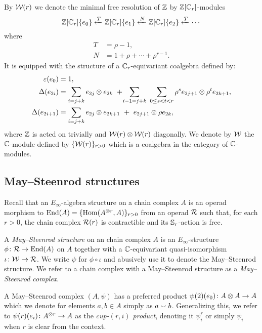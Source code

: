 By $\mathcal{W}(r)$ we denote the minimal free resolution of $\mathbb{Z}$ by $\mathbb{Z}[\mathbb{C}_r]$-modules
\begin{equation}\label{eq: minimal resolution}
	\mathbb{Z}[\mathbb{C}_r]\{e_0\} \xleftarrow{T} \mathbb{Z}[\mathbb{C}_r]\{e_1\} \xleftarrow{N} \mathbb{Z}[\mathbb{C}_r]\{e_2\} \xleftarrow{T} \cdots
\end{equation}
where
\begin{equation} \label{eq: T and R definition}
	\begin{split}
		T &= \rho - 1, \\
		N &= 1 + \rho + \cdots + \rho^{r-1}.
	\end{split}
\end{equation}
It is equipped with the structure of a $\mathbb{C}_r$-equivariant coalgebra defined by:
\begin{align*}
	\varepsilon(e_0) &= 1, \\
	\Delta(e_{2i}) &=
	\sum_{i=j+k} e_{2j} \otimes e_{2k} \ + \! \sum_{i-1=j+k} \ \sum_{0 \leq s < t < r} \rho^s e_{2j+1} \otimes \rho^t e_{2k+1}, \\
	\Delta(e_{2i+1}) &=
	\sum_{i=j+k} e_{2j} \otimes e_{2k+1} \ +\ e_{2j+1} \otimes \rho e_{2k},
\end{align*}
where $\mathbb{Z}$ is acted on trivially and $\mathcal{W}(r) \otimes \mathcal{W}(r)$ diagonally.
We denote by $\mathcal{W}$ the $\mathbb{C}$-module defined by $\{\mathcal{W}(r)\}_{r > 0}$ which is a coalgebra in the category of $\mathbb{C}$-modules.

\subsection{May--Steenrod structures}

Recall that an $E_\infty$-algebra structure on a chain complex $A$ is an operad morphism to $\mathrm{End}(A) = \{\mathrm{Hom}(A^{\otimes r}, A)\}_{r>0}$ from an operad $\mathcal{R}$ such that, for each $r > 0$, the chain complex $\mathcal{R}(r)$ is contractible and its $\mathbb{S}_r$-action is free.

A \textit{May--Steenrod structure} on an chain complex $A$ is an $E_\infty$-structure $\phi \colon \mathcal{R} \to \mathrm{End}(A)$ on $A$ together with a $\mathbb{C}$-equivariant quasi-isomorphism $\iota \colon \mathcal{W} \to \mathcal{R}$.
We write $\psi$ for $\phi \circ \iota$ and abusively use it to denote the May--Steenrod structure.
We refer to a chain complex with a May--Steenrod structure as a \textit{May--Steenrod complex}.

A May--Steenrod complex $(A,\psi)$ has a preferred product $\psi(2)(e_0) \colon A \otimes A \to A$ which we denote for elements $a, b \in A$ simply as $a \smallsmile b$.
Generalizing this, we refer to $\psi(r)(e_i) \colon A^{\otimes r} \to A$ as the \textit{cup-$(r,i)$ product}, denoting it $\psi_i^r$ or simply $\psi_i$ when $r$ is clear from the context.

